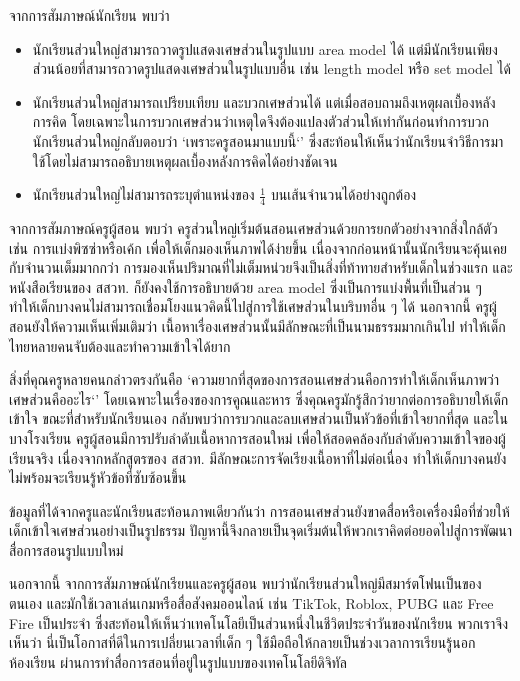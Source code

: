 จากการสัมภาษณ์นักเรียน พบว่า 
\begin{itemize}
    \item นักเรียนส่วนใหญ่สามารถวาดรูปแสดงเศษส่วนในรูปแบบ area model ได้ แต่มีนักเรียนเพียงส่วนน้อยที่สามารถวาดรูปแสดงเศษส่วนในรูปแบบอื่น เช่น length model หรือ set model ได้
    \item นักเรียนส่วนใหญ่สามารถเปรียบเทียบ และบวกเศษส่วนได้ แต่เมื่อสอบถามถึงเหตุผลเบื้องหลังการคิด โดยเฉพาะในการบวกเศษส่วนว่าเหตุใดจึงต้องแปลงตัวส่วนให้เท่ากันก่อนทำการบวก 
    นักเรียนส่วนใหญ่กลับตอบว่า `เพราะครูสอนมาแบบนี้`' ซึ่งสะท้อนให้เห็นว่านักเรียนจำวิธีการมาใช้โดยไม่สามารถอธิบายเหตุผลเบื้องหลังการคิดได้อย่างชัดเจน
    \item นักเรียนส่วนใหญ่ไม่สามารถระบุตำแหน่งของ $\frac{1}{4}$ บนเส้นจำนวนได้อย่างถูกต้อง
\end{itemize}

จากการสัมภาษณ์ครูผู้สอน พบว่า ครูส่วนใหญ่เริ่มต้นสอนเศษส่วนด้วยการยกตัวอย่างจากสิ่งใกล้ตัว เช่น การแบ่งพิซซ่าหรือเค้ก เพื่อให้เด็กมองเห็นภาพได้ง่ายขึ้น 
เนื่องจากก่อนหน้านั้นนักเรียนจะคุ้นเคยกับจำนวนเต็มมากกว่า การมองเห็นปริมาณที่ไม่เต็มหน่วยจึงเป็นสิ่งที่ท้าทายสำหรับเด็กในช่วงแรก 
และหนังสือเรียนของ สสวท. ก็ยังคงใช้การอธิบายด้วย area model ซึ่งเป็นการแบ่งพื้นที่เป็นส่วน ๆ 
ทำให้เด็กบางคนไม่สามารถเชื่อมโยงแนวคิดนี้ไปสู่การใช้เศษส่วนในบริบทอื่น ๆ ได้ นอกจากนี้ ครูผู้สอนยังให้ความเห็นเพิ่มเติมว่า 
เนื้อหาเรื่องเศษส่วนนั้นมีลักษณะที่เป็นนามธรรมมากเกินไป ทำให้เด็กไทยหลายคนจับต้องและทำความเข้าใจได้ยาก

สิ่งที่คุณครูหลายคนกล่าวตรงกันคือ `ความยากที่สุดของการสอนเศษส่วนคือการทำให้เด็กเห็นภาพว่าเศษส่วนคืออะไร`' โดยเฉพาะในเรื่องของการคูณและหาร 
ซึ่งคุณครูมักรู้สึกว่ายากต่อการอธิบายให้เด็กเข้าใจ ขณะที่สำหรับนักเรียนเอง กลับพบว่าการบวกและลบเศษส่วนเป็นหัวข้อที่เข้าใจยากที่สุด และในบางโรงเรียน 
ครูผู้สอนมีการปรับลำดับเนื้อหาการสอนใหม่ เพื่อให้สอดคล้องกับลำดับความเข้าใจของผู้เรียนจริง เนื่องจากหลักสูตรของ สสวท. มีลักษณะการจัดเรียงเนื้อหาที่ไม่ต่อเนื่อง 
ทำให้เด็กบางคนยังไม่พร้อมจะเรียนรู้หัวข้อที่ซับซ้อนขึ้น

ข้อมูลที่ได้จากครูและนักเรียนสะท้อนภาพเดียวกันว่า การสอนเศษส่วนยังขาดสื่อหรือเครื่องมือที่ช่วยให้เด็กเข้าใจเศษส่วนอย่างเป็นรูปธรรม 
ปัญหานี้จึงกลายเป็นจุดเริ่มต้นให้พวกเราคิดต่อยอดไปสู่การพัฒนาสื่อการสอนรูปแบบใหม่

นอกจากนี้ จากการสัมภาษณ์นักเรียนและครูผู้สอน พบว่านักเรียนส่วนใหญ่มีสมาร์ตโฟนเป็นของตนเอง และมักใช้เวลาเล่นเกมหรือสื่อสังคมออนไลน์ เช่น 
TikTok, Roblox, PUBG และ Free Fire เป็นประจำ ซึ่งสะท้อนให้เห็นว่าเทคโนโลยีเป็นส่วนหนึ่งในชีวิตประจำวันของนักเรียน 
พวกเราจึงเห็นว่า นี่เป็นโอกาสที่ดีในการเปลี่ยนเวลาที่เด็ก ๆ ใช้มือถือให้กลายเป็นช่วงเวลาการเรียนรู้นอกห้องเรียน ผ่านการทำสื่อการสอนที่อยู่ในรูปแบบของเทคโนโลยีดิจิทัล

